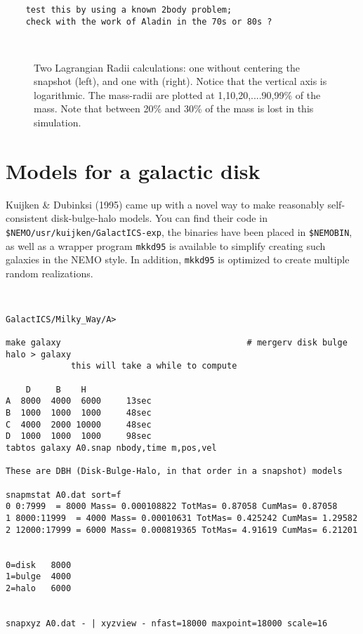 {\begin{verbatim}
    test this by using a known 2body problem; 
    check with the work of Aladin in the 70s or 80s ?



\end{verbatim}\normalsize

\begin{figure}[htb]
\caption[Lagrangian Radii for a Cold Collapse]
{Two Lagrangian Radii calculations: one without centering the
snapshot (left), and one with (right). Notice that the vertical axis is
logarithmic. The mass-radii are plotted at
1,10,20,....90,99\% of the mass. Note that between 20\% and 30\% of the
mass is lost in this simulation.}
\end{figure}




\section{Models for a galactic disk}

Kuijken \& Dubinksi (1995) came up with a novel way to make reasonably
self-consistent disk-bulge-halo models. You can find
their code in {\tt \$NEMO/usr/kuijken/GalactICS-exp}, the binaries have
been placed in {\tt \$NEMOBIN}, as well as a wrapper program
{\tt mkkd95} is available to simplify creating such galaxies in the
NEMO style. In addition, {\tt mkkd95} is optimized to create
multiple random realizations.

\footnotesize\begin{verbatim}


GalactICS/Milky_Way/A> 

make galaxy                                     # mergerv disk bulge halo > galaxy
             this will take a while to compute

    D     B    H
A  8000  4000  6000     13sec
B  1000  1000  1000     48sec
C  4000  2000 10000     48sec
D  1000  1000  1000     98sec
tabtos galaxy A0.snap nbody,time m,pos,vel

These are DBH (Disk-Bulge-Halo, in that order in a snapshot) models

snapmstat A0.dat sort=f
0 0:7999  = 8000 Mass= 0.000108822 TotMas= 0.87058 CumMas= 0.87058
1 8000:11999  = 4000 Mass= 0.00010631 TotMas= 0.425242 CumMas= 1.29582
2 12000:17999 = 6000 Mass= 0.000819365 TotMas= 4.91619 CumMas= 6.21201


0=disk   8000
1=bulge  4000
2=halo   6000


snapxyz A0.dat - | xyzview - nfast=18000 maxpoint=18000 scale=16


\end{verbatim}}
